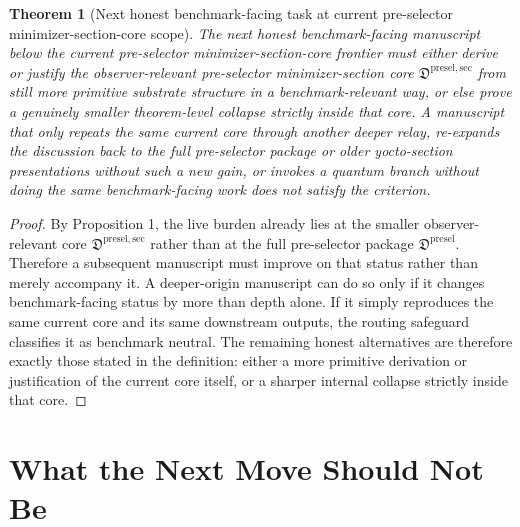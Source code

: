 \documentclass[11pt]{article}
\newcommand{\PreSelectorPackage}{\mathfrak D^{\mathrm{presel}}}
\newcommand{\PreSelectorMinSectionCore}{\mathfrak D^{\mathrm{presel,sec}}}
\newtheorem{theorem}{Theorem}
\begin{document}
\begin{theorem}[Next honest benchmark-facing task at current pre-selector minimizer-section-core scope]
The next honest benchmark-facing manuscript below the current pre-selector minimizer-section-core frontier must either derive or justify the observer-relevant pre-selector minimizer-section core \(\PreSelectorMinSectionCore\) from still more primitive substrate structure in a benchmark-relevant way, or else prove a genuinely smaller theorem-level collapse strictly inside that core. A manuscript that only repeats the same current core through another deeper relay, re-expands the discussion back to the full pre-selector package or older yocto-section presentations without such a new gain, or invokes a quantum branch without doing the same benchmark-facing work does not satisfy the criterion.
\end{theorem}

\begin{proof}
By Proposition 1, the live burden already lies at the smaller observer-relevant core \(\PreSelectorMinSectionCore\) rather than at the full pre-selector package \(\PreSelectorPackage\). Therefore a subsequent manuscript must improve on that status rather than merely accompany it. A deeper-origin manuscript can do so only if it changes benchmark-facing status by more than depth alone. If it simply reproduces the same current core and its same downstream outputs, the routing safeguard classifies it as benchmark neutral. The remaining honest alternatives are therefore exactly those stated in the definition: either a more primitive derivation or justification of the current core itself, or a sharper internal collapse strictly inside that core.
\end{proof}

\section{What the Next Move Should Not Be}
\end{document}
